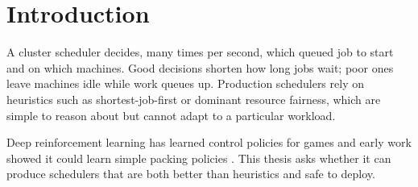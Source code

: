 \chapter{Introduction}
\label{ch:introduction}

A cluster scheduler decides, many times per second, which queued job to start and on which
machines. Good decisions shorten how long jobs wait; poor ones leave machines idle while work
queues up. Production schedulers rely on heuristics such as shortest-job-first or dominant
resource fairness, which are simple to reason about but cannot adapt to a particular workload.

Deep reinforcement learning has learned control policies for games \citep{mnih2015} and early
work showed it could learn simple packing policies \citep{mao2016}. This thesis asks whether
it can produce schedulers that are both better than heuristics and safe to deploy.
